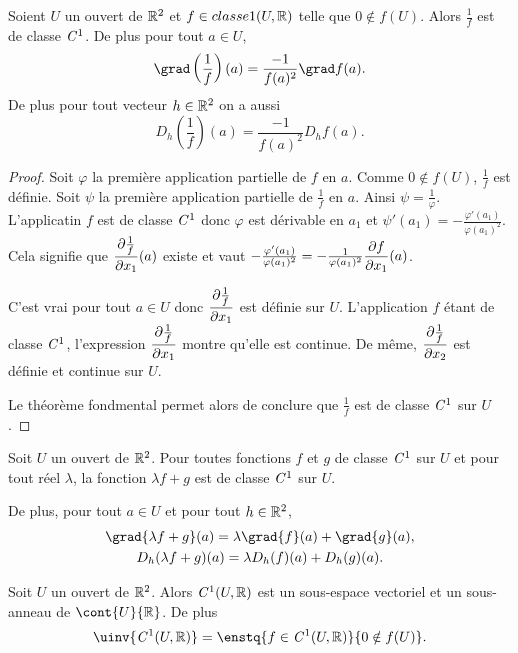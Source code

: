 \begin{lemme}
  Soient $U$ un ouvert de $\mathbb{R}^2$ et $f \in classe{1}(U, \mathbb{R})$ telle que $0 \not\in f(U)$. Alors $\frac{1}{f}$ est de classe $\mathit{C}^1$. De plus pour tout $a \in U$,
  \begin{equation}
    \grad \left(\frac{1}{f}\right)(a) = \frac{-1}{f(a)^2} \grad f(a).
  \end{equation}
  De plus pour tout vecteur $h \in \mathbb{R}^2$ on a aussi
  \begin{equation}
    D_h \left(\frac{1}{f}\right)(a) = \frac{-1}{f(a)^2} D_h f(a).
  \end{equation}
\end{lemme}
\begin{proof}
Soit $\varphi$ la première application partielle de $f$ en $a$. Comme $0 \notin f(U)$, $\frac{1}{f}$ est définie. Soit $\psi$ la première application partielle de $\frac{1}{f}$ en $a$. Ainsi $\psi= \frac{1}{\varphi}$. L'applicatin $f$ est de classe $\mathit{C}^1$ donc $\varphi$ est dérivable en $a_1$ et $\psi'(a_1)=-\frac{\varphi'(a_1)}{\varphi(a_1)^2}$. Cela signifie que $\dfrac{\partial \frac{1}{f}}{\partial x_1}(a)$ existe et vaut $-\frac{\varphi'(a_1)}{\varphi(a_1)^2}=-\frac{1}{\varphi(a_1)^2}\dfrac{\partial f}{\partial x_1}(a)$.

C'est vrai pour tout $a \in U$ donc $\dfrac{\partial \frac{1}{f}}{\partial x_1}$ est définie sur $U$. L'application $f$ étant de classe $\mathit{C}^1$, l'expression $\dfrac{\partial \frac{1}{f}}{\partial x_1}$ montre qu'elle est continue. De même, $\dfrac{\partial \frac{1}{f}}{\partial x_2}$ est définie et continue sur $U$.

Le théorème fondmental permet alors de conclure que $\frac{1}{f}$ est de classe $\mathit{C}^1$ sur $U$.
\end{proof}
\begin{lemme}
  Soit $U$ un ouvert de $\mathbb{R}^2$. Pour toutes fonctions $f$ et $g$ de classe $\mathit{C}^1$ sur $U$ et pour tout réel $\lambda$, la fonction $\lambda f +g$ est de classe $\mathit{C}^1$ sur $U$. 

De plus, pour tout $a \in U$ et pour tout $h \in \mathbb{R}^2$,
\begin{gather}
  \grad{\lambda f+g}(a) = \lambda \grad{f}(a) + \grad{g}(a), \\
  D_h(\lambda f+g)(a) = \lambda D_h(f)(a) + D_h(g)(a).
\end{gather}
\end{lemme}
\begin{theo}
  Soit $U$ un ouvert de $\mathbb{R}^2$. Alors $\mathit{C}^1(U, \mathbb{R})$ est un sous-espace vectoriel et un sous-anneau de $\cont{U}{\R}$. De plus
    \begin{equation}
      \uinv{\classe{1}(U, \R)}=\enstq{f \in \classe{1}(U, \R)}{0 \notin f(U)}.
    \end{equation}
\end{theo}

